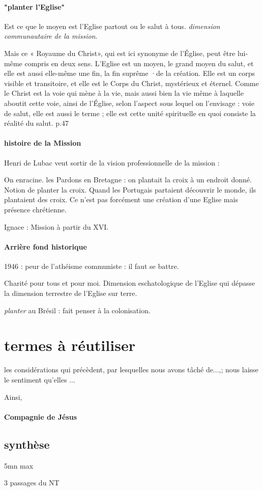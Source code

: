 \paragraph{"planter l'Eglise"}
Est ce que le moyen est l'Eglise partout ou le salut à tous. \textit{dimension communautaire de la mission}.
\begin{singlequote}
    Mais ce « Royaume du Christ», qui est ici synonyme de l'Église, peut être lui-même compris en deux sens. L'Eglise est un moyen, le grand moyen du salut, et elle est aussi elle-même une fin, la fin suprême ·de la création. Elle est un corps visible et transitoire, et elle est le Corps du Christ, mystérieux et éternel. Comme le Christ est la voie qui mène à la vie, mais aussi bien la vie même à laquelle aboutit cette voie, ainsi de l'Église, selon l'aspect sous lequel on l'envisage : voie de salut, elle est aussi le terme ; elle est cette unité spirituelle en quoi consiste la réalité du salut. p.47
\end{singlequote}

\paragraph{histoire de la Mission} Henri de Lubac veut sortir de la vision professionnelle de la mission : 
\begin{singlequote}
    On enracine. les Pardons en Bretagne : on plantait la croix à un endroit donné. 
    Notion de planter la croix. Quand les Portugais partaient découvrir le monde, ils plantaient des croix.
    Ce n'est pas forcément une création d'une Eglise mais présence chrétienne.

    Ignace : Mission à partir du XVI. 

    
\end{singlequote}

\paragraph{Arrière fond historique} 1946 : peur de l'athéisme communiste : il faut se battre. 
\begin{Synthesis}
    Charité pour tous et pour moi.
    Dimension eschatologique de l'Eglise qui dépasse la dimension terrestre de l'Eglise sur terre.  
\end{Synthesis}

\textit{planter} au Brésil : fait penser à la colonisation. 
\section{termes à réutiliser}

les considérations qui précèdent, par lesquelles nous avons tâché de...,; nous laisse le sentiment qu'elles ...

Ainsi,


\paragraph{Compagnie de Jésus}
\begin{singlequote}
    
\end{singlequote}


\subsection{synthèse}

5mn max

3 passages du NT